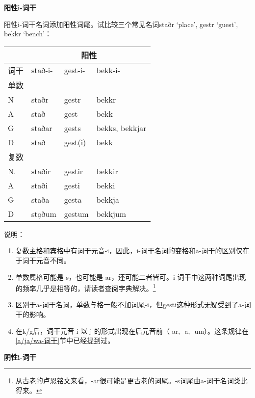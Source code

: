 \textbf{阳性i-词干}

阳性i-词干名词添加阳性词尾。试比较三个常见名词staðr `place', gestr
`guest', bekkr `bench'：

\begin{longtable}{llll}
  \toprule
     & \multicolumn{3}{c}{阳性}                            \\
  \midrule
  \endhead
  \bottomrule
  \endfoot
  词干 & stað-i-                & gest-i- & bekk-i-        \\
  单数 &                        &         &                \\
  N  & staðr                  & gestr   & bekkr          \\
  A  & stað                   & gest    & bekk           \\
  G  & staðar                 & gests   & bekks, bekkjar \\
  D  & stað                   & gest(i) & bekk           \\
  复数 &                        &         &                \\
  N. & staðir                 & gestir  & bekkir         \\
  A  & staði                  & gesti   & bekki          \\
  G  & staða                  & gesta   & bekkja         \\
  D  & stǫðum                 & gestum  & bekkjum        \\
\end{longtable}

说明：

\begin{enumerate}
  \def\labelenumi{\arabic{enumi})}
  \item
        复数主格和宾格中有词干元音-i，因此，i-词干名词的变格和a-词干的区别仅在于词干元音不同。
  \item
        单数属格可能是-s，也可能是-ar，还可能二者皆可。i-词干中这两种词尾出现的频率几乎是相等的，请读者查阅字典解决。\footnote{从古老的卢恩铭文来看，-ar很可能是更古老的词尾。-s词尾由a-词干名词类比得来。}
  \item
        区别于a-词干名词，单数与格一般不加词尾-i，但gesti这种形式无疑受到了a-词干的影响。
  \item
        在k/g后，词干元音-i-以-j-的形式出现在后元音前（-ar, -a,
        -um）。这条规律在\ref{a/ja/wa-词干}节中已经提到过。
\end{enumerate}

\textbf{阴性i-词干}

